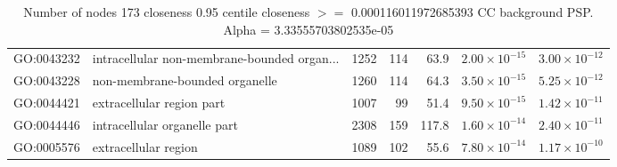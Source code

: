 \begin{table}[ht]
\begin{adjustbox}{max width=\textwidth}
\begin{tabular}{llrrrrr}
  GO:0043232 & intracellular non-membrane-bounded organ... & 1252 & 114 & 63.9 & $2.00 \times 10^{-15}$ & $3.00 \times 10^{-12}$ \\ 
  GO:0043228 & non-membrane-bounded organelle & 1260 & 114 & 64.3 & $3.50 \times 10^{-15}$ & $5.25 \times 10^{-12}$ \\ 
  GO:0044421 & extracellular region part & 1007 & 99 & 51.4 & $9.50 \times 10^{-15}$ & $1.42 \times 10^{-11}$ \\ 
  GO:0044446 & intracellular organelle part & 2308 & 159 & 117.8 & $1.60 \times 10^{-14}$ & $2.40 \times 10^{-11}$ \\ 
  GO:0005576 & extracellular region & 1089 & 102 & 55.6 & $7.80 \times 10^{-14}$ & $1.17 \times 10^{-10}$ \\ 
   \hline
\end{tabular}
\end{adjustbox}
\caption{Number of nodes 173 closeness 0.95 centile  closeness $>=$ 0.000116011972685393 CC background PSP. Alpha = 3.33555703802535e-05} 
\label{tab:Number of nodes 173 closeness 0.95 centile  closeness $>=$ 0.000116011972685393 CC background PSP. Alpha = 3.33555703802535e-05}
\end{table}



